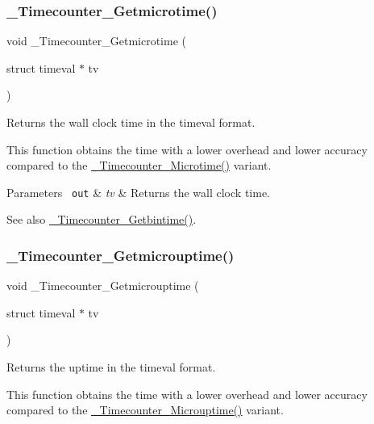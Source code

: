 \subsubsection{\texorpdfstring{\_Timecounter\_Getmicrotime()}{\_Timecounter\_Getmicrotime()}}
{\footnotesize\ttfamily void \+\_\+\+Timecounter\+\_\+\+Getmicrotime (\begin{DoxyParamCaption}\item[{struct timeval $\ast$}]{tv }\end{DoxyParamCaption})}



Returns the wall clock time in the timeval format. 

This function obtains the time with a lower overhead and lower accuracy compared to the \mbox{\hyperlink{group__RTEMSScoreTimecounter_ga186755758b9fbe63a174ddf24eec5986}{\+\_\+\+Timecounter\+\_\+\+Microtime()}} variant.


\begin{DoxyParams}[1]{Parameters}
\mbox{\texttt{ out}}  & {\em tv} & Returns the wall clock time.\\
\hline
\end{DoxyParams}
\begin{DoxySeeAlso}{See also}
\mbox{\hyperlink{group__RTEMSScoreTimecounter_gaad315babe0faa38d8e287b6354e7e1f7}{\+\_\+\+Timecounter\+\_\+\+Getbintime()}}. 
\end{DoxySeeAlso}
\mbox{\label{group__RTEMSScoreTimecounter_ga2e0c99585b4849dffa58b2ac55cfc550}} 
\subsubsection{\texorpdfstring{\_Timecounter\_Getmicrouptime()}{\_Timecounter\_Getmicrouptime()}}
{\footnotesize\ttfamily void \+\_\+\+Timecounter\+\_\+\+Getmicrouptime (\begin{DoxyParamCaption}\item[{struct timeval $\ast$}]{tv }\end{DoxyParamCaption})}



Returns the uptime in the timeval format. 

This function obtains the time with a lower overhead and lower accuracy compared to the \mbox{\hyperlink{group__RTEMSScoreTimecounter_ga36ddf99626410dfbd01f68db09070df5}{\+\_\+\+Timecounter\+\_\+\+Microuptime()}} variant.


